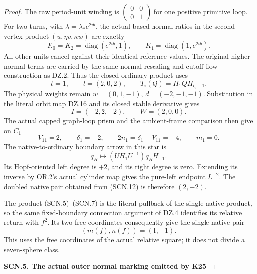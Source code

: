 \begin{proof}
The raw period-unit winding is
\(\left(\begin{smallmatrix}0&0\\0&1\end{smallmatrix}\right)\)
for one positive primitive loop. For two turns, with
\(\lambda=\lambda_*e^{2i\theta}\), the actual based normal
ratios in the second-vertex product
\((u,\eta v,\kappa w)\) are exactly
\[
 K_0=K_2=\operatorname{diag}(e^{2i\theta},1),
 \qquad K_1=\operatorname{diag}(1,e^{2i\theta}).       \tag{SCN.10}
\]
All other units cancel against their identical reference values.
The original higher normal terms are carried by the same
normal-rescaling and cutoff-flow construction as DZ.2. Thus the
closed ordinary product uses
\[
 t=1,\qquad l=(2,0,2),\qquad
 T_i(Q)=H_1 QH_{l_i-1}.
\]
The physical weights remain \(w=(0,1,-1)\),
\(d=(-2,-1,-1)\). Substitution in the literal orbit map DZ.16
and its closed stable derivative gives
\[
                  I=(-2,2,-2),\qquad W=(2,0,0).
                                                        \tag{SCN.11}
\]
The actual capped graph-loop prism and the ambient-frame
comparison then give on \(C_1\)
\[
 V_{11}=2,\qquad\delta_1=-2,\qquad
       2n_1=\delta_1-V_{11}=-4,\qquad m_1=0.
                                                        \tag{SCN.12}
\]
The native-to-ordinary boundary arrow in this star is
\[
                    q_H\mapsto
                   (U H_1U^{-1})q_H H_{-1}.
                                                        \tag{SCN.13}
\]
Its Hopf-oriented left degree is \(+2\), and its right degree
is zero. Extending its inverse by OR.2's actual cylinder map
gives the pure-left endpoint \(L^{-2}\). The doubled native
pair obtained from (SCN.12) is therefore \((2,-2)\).

The product (SCN.5)--(SCN.7) is the literal pullback of the
single native product, so the same fixed-boundary connection
argument of DZ.4 identifies its relative return with \(f^2\).
Its two free coordinates consequently give the single native
pair
\[
                               (m(f),n(f))=(1,-1).
                                                        \tag{SCN.14}
\]
This uses the free coordinates of the actual relative square;
it does not divide a seven-sphere class.

\par

\medskip\noindent\textbf{SCN.5. The actual outer normal marking omitted by K25}

\par\nobreak


\end{proof}

